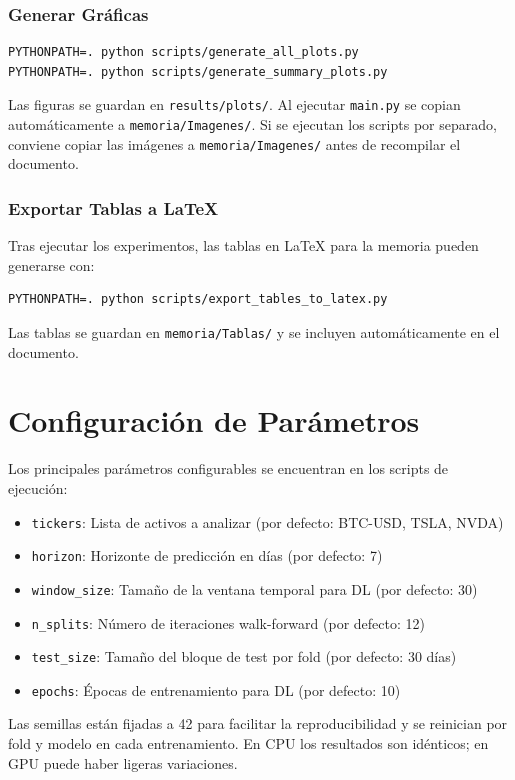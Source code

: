 \subsubsection{Generar Gráficas}
\begin{verbatim}
PYTHONPATH=. python scripts/generate_all_plots.py
PYTHONPATH=. python scripts/generate_summary_plots.py
\end{verbatim}
Las figuras se guardan en \texttt{results/plots/}. Al ejecutar \texttt{main.py} se copian automáticamente a \texttt{memoria/Imagenes/}. Si se ejecutan los scripts por separado, conviene copiar las imágenes a \texttt{memoria/Imagenes/} antes de recompilar el documento.

\subsubsection{Exportar Tablas a LaTeX}

Tras ejecutar los experimentos, las tablas en LaTeX para la memoria pueden generarse con:
\begin{verbatim}
PYTHONPATH=. python scripts/export_tables_to_latex.py
\end{verbatim}
Las tablas se guardan en \texttt{memoria/Tablas/} y se incluyen automáticamente en el documento.

\section{Configuración de Parámetros}

Los principales parámetros configurables se encuentran en los scripts de ejecución:

\begin{itemize}
    \item \texttt{tickers}: Lista de activos a analizar (por defecto: BTC-USD, TSLA, NVDA)
    \item \texttt{horizon}: Horizonte de predicción en días (por defecto: 7)
    \item \texttt{window\_size}: Tamaño de la ventana temporal para DL (por defecto: 30)
    \item \texttt{n\_splits}: Número de iteraciones walk-forward (por defecto: 12)
    \item \texttt{test\_size}: Tamaño del bloque de test por fold (por defecto: 30 días)
    \item \texttt{epochs}: Épocas de entrenamiento para DL (por defecto: 10)
\end{itemize}
Las semillas están fijadas a 42 para facilitar la reproducibilidad y se reinician por fold y modelo en cada entrenamiento. En CPU los resultados son idénticos; en GPU puede haber ligeras variaciones.

